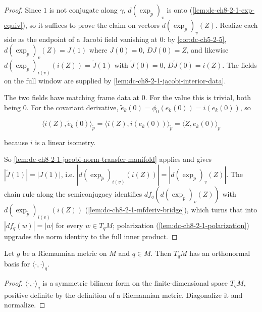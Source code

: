 \begin{proof}

\sketch
  Since $1$ is not conjugate along $\gamma$, $d(\exp_p)_v$ is onto
  (\cref{lem:dc-ch8-2-1-exp-equiv}), so it suffices to prove the claim on vectors
  $d(\exp_p)_v(Z)$. Realize each side as the endpoint of a Jacobi field vanishing at $0$:
  by \cref{cor:dc-ch5-2-5}, $d(\exp_p)_v(Z)=J(1)$ where $J(0)=0$, $DJ(0)=Z$, and likewise
  $d(\exp_{\tilde p})_{i(v)}(i(Z))=\tilde J(1)$ with
  $\tilde J(0)=0$, $D\tilde J(0)=i(Z)$. The fields on the full window are supplied by
  \cref{lem:dc-ch8-2-1-jacobi-interior-data}.

  The two fields have matching frame data at $0$. For the value this is trivial, both being
  $0$. For the covariant derivative, $\tilde e_k(0)=\phi_0(e_k(0))=i(e_k(0))$, so

  $$
  \langle i(Z),\tilde e_k(0)\rangle_{\tilde p}=\langle i(Z),i(e_k(0))\rangle_{\tilde p}
    =\langle Z,e_k(0)\rangle_p
  $$

  because $i$ is a linear isometry.

  So \cref{lem:dc-ch8-2-1-jacobi-norm-transfer-manifold} applies and gives
  $|\tilde J(1)|=|J(1)|$, i.e. $|d(\exp_{\tilde p})_{i(v)}(i(Z))|=|d(\exp_p)_v(Z)|$. The
  chain rule along the semiconjugacy identifies $df_q(d(\exp_p)_v(Z))$ with
  $d(\exp_{\tilde p})_{i(v)}(i(Z))$ (\cref{lem:dc-ch8-2-1-mfderiv-bridge}), which turns that
  into $|df_q(w)|=|w|$ for every $w\in T_qM$; polarization
  (\cref{lem:dc-ch8-2-1-polarization}) upgrades the norm identity to the full inner product.
\end{proof}

\begin{lemma}
  \label{lem:dc-ch8-2-1-metric-ortho-basis}


  Let $g$ be a Riemannian metric on $M$ and $q\in M$. Then $T_qM$ has an orthonormal basis for
  $\langle\cdot,\cdot\rangle_q$.
\end{lemma}
\begin{proof}

\sketch
  $\langle\cdot,\cdot\rangle_q$ is a symmetric bilinear form on the finite-dimensional space
  $T_qM$, positive definite by the definition of a Riemannian metric. Diagonalize it and
  normalize.
\end{proof}

